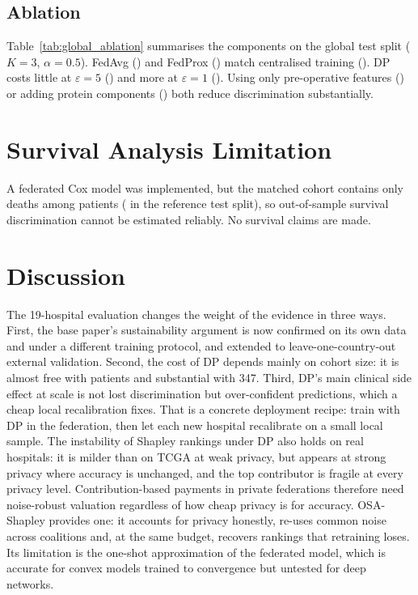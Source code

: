 \documentclass[journal]{IEEEtran}
\begin{document}
\subsection{Ablation}
Table~\ref{tab:global_ablation} summarises the components on the global test split ($K=3$, $\alpha=0.5$). FedAvg (\abAvg{}) and FedProx (\abProx{}) match centralised training (\abCen{}). DP costs little at $\varepsilon=5$ (\abDPFive{}) and more at $\varepsilon=1$ (\abDPOne{}). Using only pre-operative features (\abPreop{}) or adding protein components (\abProt{}) both reduce discrimination substantially.



\section{Survival Analysis Limitation}
A federated Cox model was implemented, but the matched cohort contains only \nEvents{} deaths among \nMatched{} patients (\nEventsTest{} in the reference test split), so out-of-sample survival discrimination cannot be estimated reliably. No survival claims are made.

\section{Discussion}
The 19-hospital evaluation changes the weight of the evidence in three ways. First, the base paper's sustainability argument is now confirmed on its own data and under a different training protocol, and extended to leave-one-country-out external validation. Second, the cost of DP depends mainly on cohort size: it is almost free with \pNineN{} patients and substantial with 347. Third, DP's main clinical side effect at scale is not lost discrimination but over-confident predictions, which a cheap local recalibration fixes. That is a concrete deployment recipe: train with DP in the federation, then let each new hospital recalibrate on a small local sample. The instability of Shapley rankings under DP also holds on real hospitals: it is milder than on TCGA at weak privacy, but appears at strong privacy where accuracy is unchanged, and the top contributor is fragile at every privacy level. Contribution-based payments in private federations therefore need noise-robust valuation regardless of how cheap privacy is for accuracy. OSA-Shapley provides one: it accounts for privacy honestly, re-uses common noise across coalitions and, at the same budget, recovers rankings that retraining loses. Its limitation is the one-shot approximation of the federated model, which is accurate for convex models trained to convergence but untested for deep networks.
\end{document}

